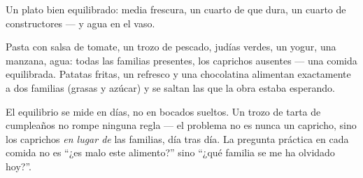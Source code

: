 \begin{omfigure}

{\small Un plato bien equilibrado: media frescura, un cuarto de
 que dura, un cuarto de constructores --- y agua en el vaso.}
\end{omfigure}

\begin{example}\label{ex:g3:balanced-diet:lunch}
Pasta con salsa de tomate, un trozo de pescado, judías verdes, un
yogur, una manzana, agua: todas las familias presentes, los caprichos
ausentes --- una comida equilibrada. Patatas fritas, un refresco y una
chocolatina alimentan exactamente a dos familias (grasas y azúcar) y
se saltan las que la obra estaba esperando.
\end{example}

\begin{remark}\label{rem:g3:balanced-diet:balance}
El equilibrio se mide en días, no en bocados sueltos. Un trozo de
tarta de cumpleaños no rompe ninguna regla --- el problema no es nunca
un capricho, sino los caprichos \emph{en lugar de} las familias, día
tras día. La pregunta práctica en cada comida no es ``¿es malo este
alimento?'' sino ``¿qué familia se me ha olvidado hoy?''.
\end{remark}

